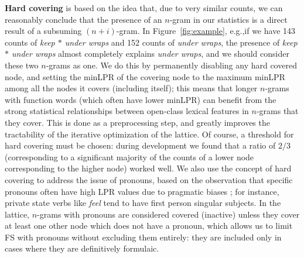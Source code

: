\documentclass[11pt,letterpaper]{article}
\makeatletter
\def \eg {e.g.,\@ }
\newcommand{\gap}{$*$\xspace}
\newcommand{\ex}[1]{\textit{#1}\xspace}
\newcommand{\termdef}[1]{\textbf{#1}\xspace}
\newcommand{\figref}[2][]{Figure#1~\ref{#2}\xspace}
\makeatother
\begin{document}
\termdef{Hard covering} is based on the idea that, due to very similar counts, we can reasonably conclude that the presence of an $n$-gram in our statistics is a direct result of a subsuming $(n+i)$-gram. In \figref{fig:example}, \eg if we have 143 counts of \ex{keep \gap under wraps} and 152 counts of \ex{under wraps}, the presence of \ex{keep \gap under wraps} almost completely explains \ex{under wraps}, and we should consider these two $n$-grams as one. We do this by permanently disabling any hard covered node, and setting the minLPR of the covering node to the maximum minLPR among all the nodes it covers (including itself); this means that longer $n$-grams with function words (which often have lower minLPR) can benefit from the strong statistical relationships between open-class lexical features in $n$-grams that they cover. This is done as a preprocessing step, and greatly improves the tractability of the iterative optimization of the lattice. Of course, a threshold for hard covering must be chosen: during development we found that a ratio of $2/3$ (corresponding to a significant majority of the counts of a lower node corresponding to the higher node) worked well.  We also use the concept of hard covering to address the issue of pronouns, based on the observation that specific pronouns often have high LPR values due to pragmatic biases \cite{Brooke15b}; for instance, private state verbs like \ex{feel} tend to have first person singular subjects. In the lattice, $n$-grams with pronouns are considered covered (inactive) unless they cover at least one other node which does not have a pronoun, which allows us to limit FS with pronouns without excluding them entirely: they are included only in cases where they are definitively formulaic. 
\end{document}
